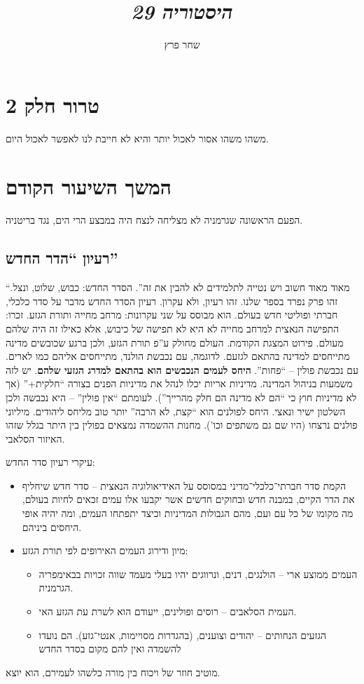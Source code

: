 \documentclass[]{article}
\author{שחר פרץ}
\title{\textit{היסטוריה 29}}
\theoremstyle{definition}
\begin{document}
    \maketitle
    \section{טרור חלק 2}
    משהו משהו אסור לאכול יותר והיא לא חייבת לנו לאפשר לאכול היום. 
    
    \section{המשך השיעור הקודם}
    הפעם הראשונה שגרמניה לא מצליחה לנצח היה במבצע הרי הים, נגד בריטניה. 
    
    \subsection{רעיון ``הדר החדש''}
    ``מאוד מאוד חשוב ויש נטייה לתלמידים לא להבין את זה''. הסדר החדש: כבוש, שלוט, ונצל. זהו פרק נפרד בספר שלנו. זהו רעיון, ולא עקרון. רעיון הסדר החדש מדבר על סדר כלכלי, חברתי ופוליטי חדש בעולם. הוא מבוסס על שני עקרונות: מרחב מחייה ותורת הגזע. זכרו: התפישה הנאצית למרחב מחייה לא היא לא תפישה של כיבוש, אלא כאילו זה היה שלהם מעולם. פירוט המצגת הקודמת. העולם מחולק ע''פ תורת הגזע, ולכן ברגע שכובשים מדינה מתייחסים למדינה בהתאם לגזעם. לדוגמה, עם נכבשת הולנד, מתייחסים אליהם כמו לארים. עם נכבשת פולין – ``פחות''. \textbf{היחס לעמים הנכבשים הוא בהתאם למדרג הגזעי שלהם}. יש לזה משמעות בניהול המדינה. מדיניות אריות יכלו לנהל את מדיניות הפנים בצורה ``חלקית+'' (אך לא מדיניות חוץ כי ``הם לא מדינה הם חלק מהרייך''). לעומתם ``אין פולין'' – היא נכבשה ולכן השלטון ישיר ונאצי. היחס לפולנים הוא ``קצת, לא הרבה'' יותר טוב מליחס ליהודים. מיליוני פולנים נרצחו (היו שם גם משתפים וכו'). מחנות ההשמדה נמצאים בפולין בין היתר בגלל שזהו האיזור הסלאבי. 
    
    עיקרי רעיון סדר החדש: 
    \begin{itemize}
        \item הקמת סדר חברתי־כלכלי־מדיני במסוסס על האידיאולוגיה הנאצית – סדר חדש שיחליף את הדר הקיים, במבנה חדש ובחוקים חדשים אשר יקבעו אלו עמים זכאים לחיות בעולם, מה מקומו של כל עם ועם, מהם הגבולות המדיניות וכיצד יתפתחו העמים, ומה יהיה אופי היחסים ביניהם. 
        \item מיון ודירוג העמים האירופים לפי תורת הגזע: 
        \begin{itemize}
            \item העמים ממוצע ארי – הולנגים, דנים, ונרווגים יהיו בעלי מעמד שווה זכויות בבאימפריה הגרמנית. 
            \item העמית הסלאבים – רוסים ופולינים, ייעודם הוא לשרת עת הגזע האי. 
            \item הגזעים הנחותים – יהודים וצוענים, (בהגדרות מסויימות, אנטי־גזע). הם נועדו להשמדה ואין להם מקום בסדר החדש
        \end{itemize}
    \end{itemize}
    מוטיב חוזר של ויכוח בין מורה כלשהו לעמירם, הוא יוצא. 
    
\end{document}
